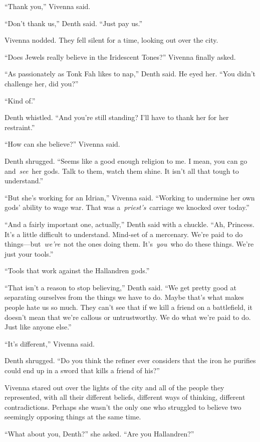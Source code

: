 “Thank you,” Vivenna said.

“Don’t thank us,” Denth said. “Just pay us.”

Vivenna nodded. They fell silent for a time, looking out over the city.

“Does Jewels really believe in the Iridescent Tones?” Vivenna finally asked.

“As passionately as Tonk Fah likes to nap,” Denth said. He eyed her. “You didn’t challenge her, did you?”

“Kind of.”

Denth whistled. “And you’re still standing? I’ll have to thank her for her restraint.”

“How can she believe?” Vivenna said.

Denth shrugged. “Seems like a good enough religion to me. I mean, you can go and~\textit{see}~her gods. Talk to them, watch them shine. It isn’t all that tough to understand.”

“But she’s working for an Idrian,” Vivenna said. “Working to undermine her own gods’ ability to wage war. That was a~\textit{priest’s}~carriage we knocked over today.”

“And a fairly important one, actually,” Denth said with a chuckle. “Ah, Princess. It’s a little difficult to understand. Mind-set of a mercenary. We’re paid to do things—but~\textit{we’re}~not the ones doing them. It’s~\textit{you}~who do these things. We’re just your tools.”

“Tools that work against the Hallandren gods.”

“That isn’t a reason to stop believing,” Denth said. “We get pretty good at separating ourselves from the things we have to do. Maybe that’s what makes people hate us so much. They can’t see that if we kill a friend on a battlefield, it doesn’t mean that we’re callous or untrustworthy. We do what we’re paid to do. Just like anyone else.”

“It’s different,” Vivenna said.

Denth shrugged. “Do you think the refiner ever considers that the iron he purifies could end up in a sword that kills a friend of his?”

Vivenna stared out over the lights of the city and all of the people they represented, with all their different beliefs, different ways of thinking, different contradictions. Perhaps she wasn’t the only one who struggled to believe two seemingly opposing things at the same time.

“What about you, Denth?” she asked. “Are you Hallandren?”

